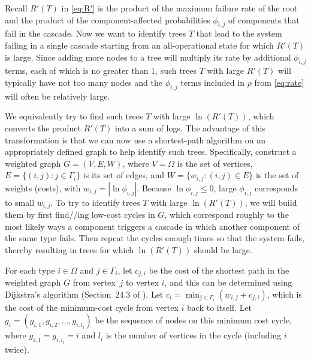 \documentclass[12pt]{article}
\begin{document}
Recall $R'(T)$ in \eqref{eq:R'}
is the product of the
maximum failure rate of the root and the
product of the component-affected
probabilities $\phi_{i,j}$ of
components that fail in
the cascade.
Now we want to
identify trees $T$ that lead to
the system failing in a single cascade
starting from an all-operational state
for which $R'(T)$ is large.
Since adding more nodes to
a tree will multiply its rate
by additional $\phi_{i,j}$ terms,
each of which is no greater than $1$,
such trees $T$
with large $R'(T)$
will
typically have not too many nodes
and the $\phi_{i,j}$ terms included
in $\rho$ from \eqref{eq:rate} will
often be relatively large.

We equivalently try to find
such trees $T$ with large $\ln(R'(T))$,
which converts the product $R'(T)$
into a sum of logs.
The advantage of this transformation
is that we can now use
a shortest-path algorithm on
an appropriately defined graph
to help identify
such trees.
Specifically,
construct a weighted graph
$G = (V,E,W)$,
where $V = \Omega$ is the set of
vertices, $E = \{ (i,j) : j \in \Gamma_i \}$
is its set of edges,
and $W = \{ w_{i,j} : (i,j) \in E \}$
is the set of weights (costs),
with $w_{i,j} = | \ln \phi_{i,j} |$.
Because $\ln \phi_{i,j} \leq 0$,
large $\phi_{i,j}$ corresponds to
small $w_{i,j}$.
To try to identify trees $T$ with large
$\ln(R'(T))$, we will build them
by first find//ing low-cost cycles
in $G$, which correspond roughly to
the most likely ways a component triggers
a cascade in which another component
of the same type fails.
Then repeat the cycles 
enough times so that the system
fails, thereby resulting in trees
for which $\ln(R'(T))$ should
be large.


For each type $i \in \Omega$ and
$j \in \Gamma_i$,
let $c_{j,i}$ be the cost of
the shortest path in the
weighted graph $G$ from vertex~$j$
to vertex $i$, and this can be determined
using Dijkstra's algorithm
(Section~24.3 of \cite{CLRS:2001}).
Let $c_i = \min_{j \in \Gamma_i}
(w_{i,j} + c_{j,i})$,
which is the cost of the
minimum-cost cycle from vertex $i$
back to itself.
Let $g_i = (g_{i,1}, g_{i,2},
\dots, g_{i,l_i})$ be the sequence of
nodes on this minimum cost cycle,
where $g_{i,1} = g_{i,l_i} = i$
and $l_i$ is the number
of vertices in the cycle
(including $i$ twice).
\end{document}
